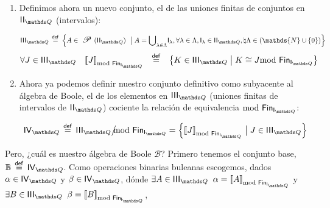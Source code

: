 \documentclass[final,12pt,a4paper,twoside,fleqn]{extbook}
\newcommand{\sthen}{\ensuremath{\Longrightarrow}}
\newcommand{\mathdef}{\ensuremath{\stackrel{\mathsf{def}}{{}={}}}}
\newcommand{\then}{\ensuremath{\sthen}}
\newcommand{\set}[1]{\ensuremath{\left\lbrace{#1}\right\rbrace}}
\newcommand {\setCompr}[2]{
	\ensuremath{
		\left\lbrace{ 
			#1 {\;\big{\vert}\;} #2
        }\right\rbrace
    }
}
\newcommand{\setN}{\ensuremath{\mathds{N}}}
\newcommand{\setB}{\ensuremath{\mathbb{B}}}
\theoremstyle{definition}
\theoremstyle{remark}
\begin{document}
\begin{enumerate}
{\begin{enumerate}
{  
  
  \begin{align}
  &\forall A, B, C \in \IIQ\\ \nonumber
  &\left( A \cong B \FinDiffRel \right) \land \left( B \cong C
  \FinDiffRel \right) \;\then\; A \cong C \FinDiffRel
  \end{align}
  }
  \end{enumerate}
  
  
  
  }
  
  
  
  \item {Definimos ahora un nuevo conjunto, el de las uniones finitas de
  conjuntos en \(\IIQ\) (intervalos):
  
  
  
  \begin{equation}
  \IIIQ \mathdef \setCompr
  { A \in \powset{\left( \IIQ
  \right) } }  
  { A = {{\bigcup}_{\lambda\in\Lambda}} {\mathsf{I}}_{\lambda}, 
  \forall \lambda \in \Lambda, 
  {{\mathsf{I}}_{\lambda}} \in \IIQ,  
  \natural{ \Lambda } \in \left( \setN \cup \set{0} \right) }
  \end{equation}
  \begin{equation}
  \forall J \in \IIIQ \quad \ClEqFinDiff{J} \;\;\mathdef\;\;
  \setCompr{K\in\IIIQ}{K \cong J \FinDiffRel}
  \end{equation}
  }
  
  
  
  \item {Ahora ya podemos definir nuestro conjunto definitivo como 
      subyacente al álgebra de Boole, el de los elementos en \(\IIIQ\) 
      (uniones finitas de intervalos de \(\IIQ\)) cociente la relación de 
      equivalencia \(\FinDiffRel\):
  
  
  
  \begin{equation}
  \IVQ \mathdef \QuotSetEqRel{\IIIQ} = \setCompr{\ClEqFinDiff{J}}{J \in 
  \IIIQ}
  \end{equation}
  
  
  
  }
\end{enumerate} 



	Pero, ¿cuál es nuestro álgebra de Boole \( \mathscr{B} \)? Primero
tenemos el conjunto base, \( \setB \mathdef \IVQ \). Como operaciones
binarias buleanas escogemos, dados \(\alpha\in\IVQ\) y \(\beta\in\IVQ\),
dónde \(\exists A \in \IIIQ \;\; \alpha = \ClEqFinDiff{A}\) y \(\exists B \in
\IIIQ \;\; \beta = \ClEqFinDiff{B}\), 
\end{document}
